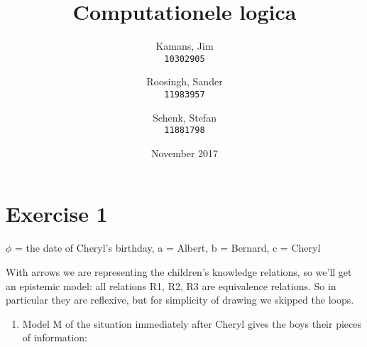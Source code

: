 \documentclass[leqno]{article}
\title{Computationele logica}
\author{
    Kamans, Jim\\
    \texttt{10302905}
    \and
    Roosingh, Sander\\
    \texttt{11983957}
    \and
    Schenk, Stefan\\
    \texttt{11881798}
}
\date{November 2017}
\begin{document}
\maketitle

\section{Exercise 1}

$\phi$ = the date of Cheryl's birthday, a = Albert, b = Bernard, c = Cheryl

With arrows we are representing the children’s knowledge relations, so we’ll get an epistemic model: all relations R1, R2, R3 are equivalence relations. So in particular they are reflexive, but for simplicity of drawing we skipped the loops.

\begin{enumerate}[label=(\alph*)]
    \item Model M of the situation immediately after Cheryl gives the boys their pieces of information:


\end{enumerate}
\end{document}
